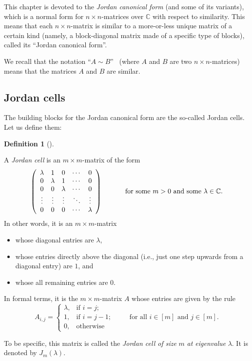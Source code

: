 \documentclass[numbers=enddot,12pt,final,onecolumn,notitlepage]{scrartcl}%
\numberwithin{exer}{subsection}
\theoremstyle{definition}
\newtheorem{defi}[theo]{Definition}
\newenvironment{definition}[1][]
{\begin{defi}[#1]\begin{leftbar}}
{\end{leftbar}\end{defi}}
\begin{document}
This chapter is devoted to the \emph{Jordan canonical form} (and some of its
variants), which is a normal form for $n\times n$-matrices over $\mathbb{C}$
with respect to similarity. This means that each $n\times n$-matrix is similar
to a more-or-less unique matrix of a certain kind (namely, a block-diagonal
matrix made of a specific type of blocks), called its \textquotedblleft Jordan
canonical form\textquotedblright.

We recall that the notation \textquotedblleft$A\sim B$\textquotedblright%
\ (where $A$ and $B$ are two $n\times n$-matrices) means that the matrices $A$
and $B$ are similar.

\subsection{Jordan cells}

The building blocks for the Jordan canonical form are the so-called Jordan
cells. Let us define them:

\begin{definition}
\label{def.jnf.jcell}A \emph{Jordan cell} is an $m\times m$-matrix of the form%
\[
\left(
\begin{array}
[c]{ccccc}%
\lambda & 1 & 0 & \cdots & 0\\
0 & \lambda & 1 & \cdots & 0\\
0 & 0 & \lambda & \cdots & 0\\
\vdots & \vdots & \vdots & \ddots & \vdots\\
0 & 0 & 0 & \cdots & \lambda
\end{array}
\right)  \ \ \ \ \ \ \ \ \ \ \text{for some }m>0\text{ and some }\lambda
\in\mathbb{C}.
\]
In other words, it is an $m\times m$-matrix

\begin{itemize}
\item whose diagonal entries are $\lambda$,

\item whose entries directly above the diagonal (i.e., just one step upwards
from a diagonal entry) are $1$, and

\item whose all remaining entries are $0$.
\end{itemize}

\noindent In formal terms, it is the $m\times m$-matrix $A$ whose entries are
given by the rule%
\[
A_{i,j}=%
\begin{cases}
\lambda, & \text{if }i=j;\\
1, & \text{if }i=j-1;\\
0, & \text{otherwise}%
\end{cases}
\ \ \ \ \ \ \ \ \ \ \text{for all }i\in\left[  m\right]  \text{ and }%
j\in\left[  m\right]  .
\]


To be specific, this matrix is called the \emph{Jordan cell of size }$m$\emph{
at eigenvalue }$\lambda$. It is denoted by $J_{m}\left(  \lambda\right)  $.
\end{definition}
\end{document}
